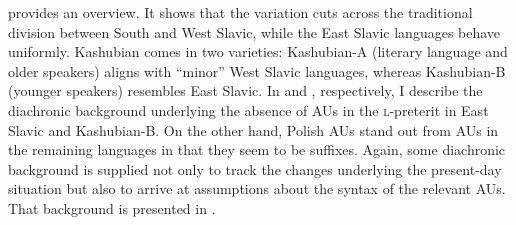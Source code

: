 \documentclass[output=paper]{langscibook}
\begin{document}
 provides an overview. It shows that the variation cuts across the traditional division between South and West Slavic, while the East Slavic languages behave uniformly. Kashubian comes in two varieties: Kashubian-A (literary language and older speakers) aligns with ``minor'' West Slavic languages, whereas Kashubian-B (younger speakers) resembles East Slavic. In  and , respectively, I describe the diachronic background underlying the absence of AUs in the \textsc{l-}preterit in East Slavic and Kashubian-B. On the other hand, Polish AUs stand out from AUs in the remaining languages in that they seem to be suffixes. Again, some diachronic background is supplied not only to track the changes underlying the present-day situation but also to arrive at assumptions about the syntax of the relevant AUs. That background is presented in .

\end{document}

